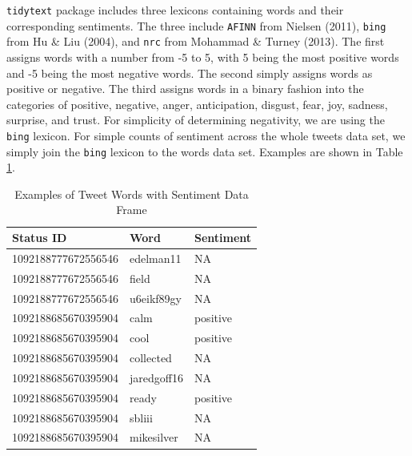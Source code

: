 \documentclass[12pt,twoside]{reedthesis}
\newenvironment{Shaded}{\begin{snugshade}}{\end{snugshade}}
\newcommand{\KeywordTok}[1]{\textcolor[rgb]{0.13,0.29,0.53}{\textbf{#1}}}
\newcommand{\StringTok}[1]{\textcolor[rgb]{0.31,0.60,0.02}{#1}}
\newcommand{\CommentTok}[1]{\textcolor[rgb]{0.56,0.35,0.01}{\textit{#1}}}
\newcommand{\OperatorTok}[1]{\textcolor[rgb]{0.81,0.36,0.00}{\textbf{#1}}}
\newcommand{\NormalTok}[1]{#1}
\begin{document}
\texttt{tidytext} package includes three lexicons containing words and
their corresponding sentiments. The three include \texttt{AFINN} from
Nielsen (2011), \texttt{bing} from Hu \& Liu (2004), and \texttt{nrc}
from Mohammad \& Turney (2013). The first assigns words with a number
from -5 to 5, with 5 being the most positive words and -5 being the most
negative words. The second simply assigns words as positive or negative.
The third assigns words in a binary fashion into the categories of
positive, negative, anger, anticipation, disgust, fear, joy, sadness,
surprise, and trust. For simplicity of determining negativity, we are
using the \texttt{bing} lexicon. For simple counts of sentiment across
the whole tweets data set, we simply join the \texttt{bing} lexicon to
the words data set. Examples are shown in Table \ref{tab:sentiments}.

\small
\begin{Shaded}
\end{Shaded}
\normalsize
\begin{table}[!h]

\caption[Examples of Tweet Words with Sentiment Data Frame]{\label{tab:sentiments}Examples of Tweet Words with Sentiment Data Frame}
\centering
\begin{tabular}{l|l|l}
\hline
Status ID & Word & Sentiment\\
\hline
1092188777672556546 & edelman11 & NA\\
\hline
1092188777672556546 & field & NA\\
\hline
1092188777672556546 & u6eikf89gy & NA\\
\hline
1092188685670395904 & calm & positive\\
\hline
1092188685670395904 & cool & positive\\
\hline
1092188685670395904 & collected & NA\\
\hline
1092188685670395904 & jaredgoff16 & NA\\
\hline
1092188685670395904 & ready & positive\\
\hline
1092188685670395904 & sbliii & NA\\
\hline
1092188685670395904 & mikesilver & NA\\
\hline
\end{tabular}
\end{table}
\end{document}

